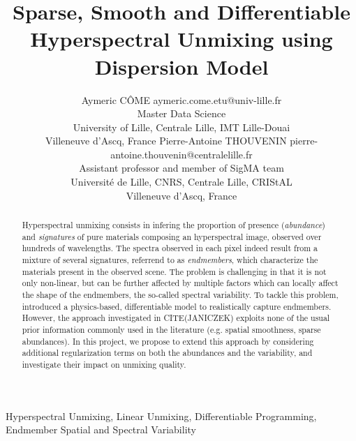 \documentclass{article}
\begin{document}
\title{Sparse, Smooth and Differentiable Hyperspectral Unmixing using Dispersion Model}

\author{\name Aymeric CÔME \email aymeric.come.etu@univ-lille.fr \\
       \addr Master Data Science\\
       University of Lille, Centrale Lille, IMT Lille-Douai\\
       Villeneuve d'Ascq, France
       \AND
       \name Pierre-Antoine THOUVENIN \email pierre-antoine.thouvenin@centralelille.fr \\
       \addr Assistant professor and member of SigMA team\\
       Université de Lille, CNRS, Centrale Lille, CRIStAL\\
       Villeneuve d'Ascq, France}

\maketitle

\begin{abstract}%
  Hyperspectral unmixing consists in infering the proportion of presence (\emph{abundance}) and \emph{signatures} of pure materials composing an hyperspectral image, observed over hundreds of wavelengths. The spectra observed in each pixel indeed result from a mixture of several signatures, referrend to as \emph{endmembers}, which characterize the materials present in the observed scene. The problem is challenging in that it is not only non-linear, but can be further affected by multiple factors which can locally affect the shape of the endmembers, the so-called spectral variability. To tackle this problem, \citep{janiczek_differentiable_2020} introduced a physics-based, differentiable model to realistically capture endmembers. However, the approach investigated in CITE(JANICZEK) exploits none of the usual prior information commonly used in the literature (e.g. spatial smoothness, sparse abundances). In this project, we propose to extend this approach by considering additional regularization terms on both the abundances and the variability, and investigate their impact on unmixing quality.
\end{abstract}

\begin{keywords}
Hyperspectral Unmixing, Linear Unmixing, Differentiable Programming, Endmember Spatial and Spectral Variability
\end{keywords}
\end{document}
